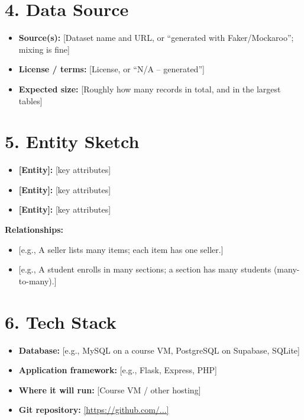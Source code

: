\documentclass[11pt]{article}
\begin{document}
\section*{4. Data Source}
\begin{itemize}
  \item \textbf{Source(s):} [Dataset name and URL, or ``generated with Faker/Mockaroo''; mixing is fine]
  \item \textbf{License / terms:} [License, or ``N/A -- generated'']
  \item \textbf{Expected size:} [Roughly how many records in total, and in the largest tables]
\end{itemize}

\section*{5. Entity Sketch}
\begin{itemize}
  \item \textbf{[Entity]:} [key attributes]
  \item \textbf{[Entity]:} [key attributes]
  \item \textbf{[Entity]:} [key attributes]
\end{itemize}
\textbf{Relationships:}
\begin{itemize}
  \item {[e.g., A seller lists many items; each item has one seller.]}
  \item {[e.g., A student enrolls in many sections; a section has many students (many-to-many).]}
\end{itemize}

\section*{6. Tech Stack}
\begin{itemize}
  \item \textbf{Database:} [e.g., MySQL on a course VM, PostgreSQL on Supabase, SQLite]
  \item \textbf{Application framework:} [e.g., Flask, Express, PHP]
  \item \textbf{Where it will run:} [Course VM / other hosting]
  \item \textbf{Git repository:} \url{[https://github.com/...]}
\end{itemize}
\end{document}
